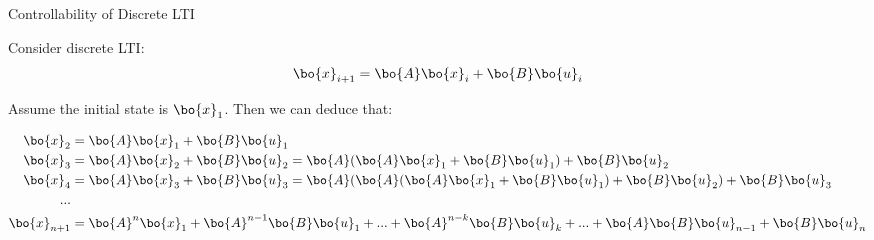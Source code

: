 \documentclass{beamer}
\begin{document}
\begin{frame}{Controllability of Discrete LTI}
\begin{flushleft}

Consider discrete LTI:
\begin{equation}
\bo{x}_{i+1} = \bo{A}  \bo{x}_i + \bo{B} \bo{u}_i
\end{equation}

Assume the initial state is $\bo{x}_1$. Then we can deduce that:

\begin{align*}
\bo{x}_2 &= \bo{A} \bo{x}_1 + \bo{B} \bo{u}_1 \\
\bo{x}_3 &= \bo{A} \bo{x}_2 + \bo{B} \bo{u}_2 = \bo{A} (\bo{A} \bo{x}_1 + \bo{B} \bo{u}_1) + \bo{B} \bo{u}_2 \\
\bo{x}_4 &= \bo{A} \bo{x}_3 + \bo{B} \bo{u}_3 = \bo{A} (\bo{A} (\bo{A} \bo{x}_1 + \bo{B} \bo{u}_1) + \bo{B} \bo{u}_2) + \bo{B} \bo{u}_3 \\
... \\
\bo{x}_{n+1} &= \bo{A}^n \bo{x}_1 + \bo{A}^{n-1} \bo{B} \bo{u}_1 + ... + 
\bo{A}^{n - k} \bo{B} \bo{u}_{k} + ... + 
\bo{A} \bo{B} \bo{u}_{n-1} +
\bo{B} \bo{u}_n
\end{align*}

\end{flushleft}
\end{frame}
\end{document}

